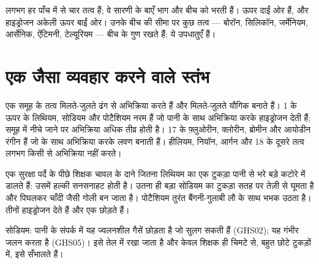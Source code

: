 \begin{proposition}[वे कहाँ स्थित हैं]\label{prop:g9:periodic-table-first-look:where}
लगभग हर पाँच में से चार तत्व  हैं; वे सारणी के बाएँ भाग और बीच को भरती
हैं।  ऊपर दाईं ओर हैं, और हाइड्रोजन अकेली ऊपर बाईं ओर। उनके बीच की
सीमा पर कुछ तत्व --- बोरॉन, सिलिकॉन, जर्मेनियम, आर्सेनिक, ऐंटिमनी, टेल्यूरियम ---
बीच के गुण रखते हैं: ये उपधातुएँ हैं।
\end{proposition}

\section{एक जैसा व्यवहार करने वाले स्तंभ}

\begin{proposition}\label{prop:g9:periodic-table-first-look:alike}
एक समूह के तत्व मिलते-जुलते ढंग से अभिक्रिया करते हैं और मिलते-जुलते यौगिक बनाते
हैं।  1 के ऊपर के लिथियम, सोडियम और पोटैशियम नरम  हैं जो पानी के साथ
अभिक्रिया करके हाइड्रोजन देती हैं; समूह में नीचे जाने पर अभिक्रिया अधिक
तीव्र होती है।  17 के फ़्लुओरीन, क्लोरीन, ब्रोमीन और आयोडीन रंगीन 
हैं जो  के साथ अभिक्रिया करके लवण बनाती हैं। हीलियम, नियॉन, आर्गन और 
18 के दूसरे तत्व लगभग किसी से अभिक्रिया नहीं करते।
\end{proposition}

\begin{inthelab}[पानी में लिथियम, सोडियम और पोटैशियम]
एक सुरक्षा पर्दे के पीछे शिक्षक चावल के दाने जितना लिथियम का एक टुकड़ा पानी से
भरे बड़े कटोरे में डालते हैं: उसमें हल्की सनसनाहट होती है। उतना ही बड़ा सोडियम का
टुकड़ा सतह पर तेज़ी से घूमता है और पिघलकर चाँदी जैसी गोली बन जाता है। पोटैशियम
तुरंत बैंगनी-गुलाबी लौ के साथ भभक उठता है। तीनों हाइड्रोजन देते हैं और एक
 छोड़ते हैं।
\end{inthelab}

\begin{safety}{}
सोडियम: पानी के संपर्क में यह ज्वलनशील गैसें छोड़ता है जो सुलग सकती हैं
(GHS02); यह गंभीर जलन करता है (GHS05)। इसे तेल में रखा जाता है और केवल
शिक्षक ही चिमटे से, बहुत छोटे टुकड़ों में, इसे सँभालते हैं।
\end{safety}

